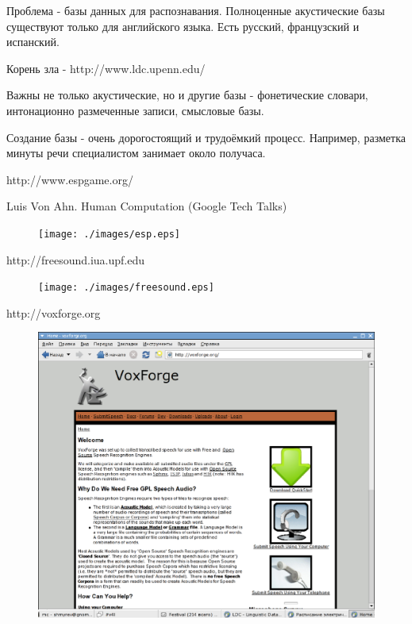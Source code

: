 \documentclass{seminar}
\begin{document}
\begin{slide}

Проблема - базы данных для распознавания. Полноценные акустические базы существуют только
для английского языка. Есть русский, французский и испанский. 

Корень зла - http://www.ldc.upenn.edu/

Важны не только акустические, но и другие базы - фонетические словари, 
интонационно размеченные записи, смысловые базы.

Создание базы - очень дорогостоящий и трудоёмкий процесс. Например, разметка
минуты речи специалистом занимает около получаса.

\end{slide}

\begin{slide}
http://www.espgame.org/

Luis Von Ahn. Human Computation (Google Tech Talks)

\begin{figure}
\begin{center}
\texttt{[image: ./images/esp.eps]}
\end{center}
\end{figure}

\end{slide}

\begin{slide}

http://freesound.iua.upf.edu

\begin{figure}
\begin{center}
\texttt{[image: ./images/freesound.eps]}
\end{center}
\end{figure}

\end{slide}

\begin{slide}

http://voxforge.org

\begin{figure}
\begin{center}
\includegraphics[width=.7\textwidth]{./images/voxforge.eps}
\end{center}
\end{figure}

\end{slide}
\end{document}
